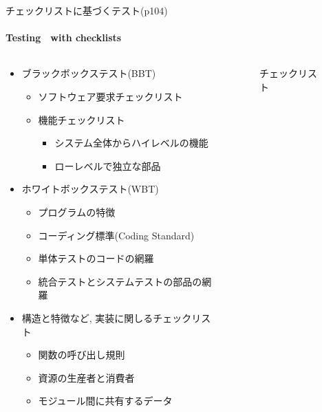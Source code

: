 \begin{frame}[shrink=20]{チェックリストに基づくテスト(p104)}
\framesubtitle{Testing　with checklists}
\begin{columns}[t]
    \begin{column}{.6\textwidth}
    \begin{itemize}
    \item ブラックボックステスト(BBT)
        \begin{itemize}
        \item ソフトウェア要求チェックリスト
        \item 機能チェックリスト
            \begin{itemize}
            \item システム全体からハイレベルの機能
            \item ローレベルで独立な部品
            \end{itemize}
        \end{itemize}
    \item ホワイトボックステスト(WBT)
        \begin{itemize}
        \item プログラムの特徴
        \item コーディング標準(Coding Standard)
        \item 単体テストのコードの網羅
        \item 統合テストとシステムテストの部品の網羅
    \end{itemize}
    \item 構造と特徴など, 実装に関しるチェックリスト
        \begin{itemize}
        \item 関数の呼び出し規則
        \item 資源の生産者と消費者
        \item モジュール間に共有するデータ
        \end{itemize}
    \end{itemize}
    \end{column}
        \begin{column}{.35\textwidth}
        \begin{figure}
        \begin{center}
            \begin{overlayarea}{\textwidth}{0.6\textheight}
            \begin{center}
            \end{center}
            \end{overlayarea}
        \caption{チェックリスト}
        \end{center}
        \end{figure}
    \end{column}
\end{columns}
\end{frame}

